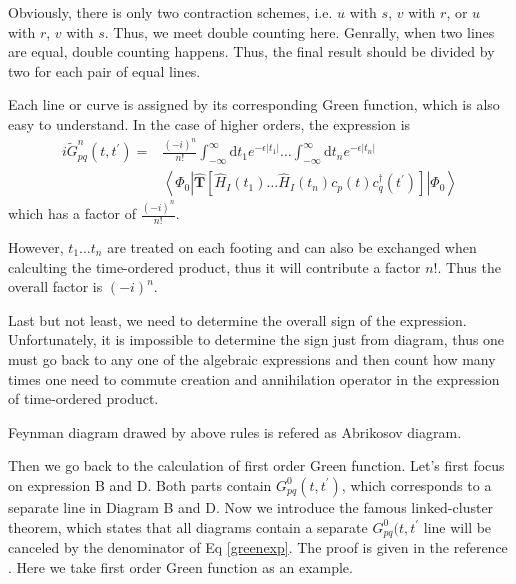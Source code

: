 Obviously, there is only two contraction schemes, i.e. $u$ with $s$, $v$ with $r$, or $u$ with $r$, $v$ with $s$. 
Thus, we meet double counting here.
Genrally, when two lines are equal, double counting happens.
Thus, the final result should be divided by two for each pair of equal lines.


Each line or curve is assigned by its corresponding Green function, which is also easy to understand.
In the case of higher orders, the expression is 
\begin{equation} \label{greenexp}
\begin{aligned}
	i \tilde{G}^n_{p q}\left(t, t^{\prime}\right)
	=& \frac{(-i)^{n}}{n !} 
	\int_{-\infty}^{\infty} \mathrm{d} t_{1} e^{-\epsilon\left|t_{1}\right|} \ldots \int_{-\infty}^{\infty} \mathrm{d} t_{n} e^{-\epsilon\left|t_{n}\right|}
	\\
	& \left\langle\Phi_{0}\left|
	\hat{\boldsymbol{T}}\left[\hat{H}_{I}\left(t_{1}\right) \ldots \hat{H}_{I}\left(t_{n}\right) c_{p}(t) c_{q}^{\dagger}\left(t^{\prime}\right)\right]\right|
	\Phi_{0}\right\rangle
\end{aligned}
\end{equation}
which has a factor of $\frac{(-i)^n}{n!}$.

However, $t_1 \dots t_n$ are treated on each footing and can also be exchanged when calculting the time-ordered product, thus it will contribute a factor $n!$.
Thus the overall factor is $(-i)^n$.

Last but not least, we need to determine the overall sign of the expression.
Unfortunately, it is impossible to determine the sign just from diagram, thus one must go back to any one of the algebraic expressions and then count how many times one need to commute creation and annihilation operator in the expression of time-ordered product.

Feynman diagram drawed by above rules is refered as Abrikosov diagram.

Then we go back to the calculation of first order Green function.
Let's first focus on expression B and D.
Both parts contain $G^0_{pq}(t,t^{\prime})$, which corresponds to a separate line in Diagram B and D.
Now we introduce the famous linked-cluster theorem, which states that all diagrams contain a separate $G^0_{pq}(t,t^{\prime}$ line will be canceled by the denominator of Eq \ref{greenexp}.
The proof is given in the reference \cite{main}.
Here we take first order Green function as an example.

